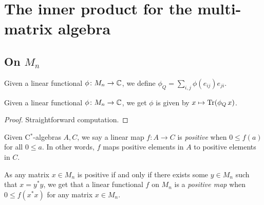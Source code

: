 \chapter{The inner product for the multi-matrix algebra}
 \section{On $M_n$}

  \begin{definition}\label{Dual.matrix}\leanok
   Given a linear functional $\phi\colon M_n \to \mathbb{C}$, we define $\phi_Q=\sum_{i,j}\phi(e_{ij})e_{ji}$.
  \end{definition}

  \begin{lemma}\label{dual_eq_trace}\leanok
   Given a linear functional $\phi\colon M_n\to\mathbb{C}$, we get $\phi$ is given by $x\mapsto\operatorname{Tr}(\phi_Q \,x)$.
  \end{lemma}
  \begin{proof}\leanok
   Straightforward computation.
  \end{proof}

  \begin{definition}\label{LinearMap.IsPosMap}\leanok
   Given C$^*$-algebras $A,C$, we say a linear map $f\colon A \to C$ is \textit{positive} when $0\leq f(a)$ for all $0\leq a$. In other words, $f$ maps positive elements in $A$ to positive elements in $C$.
  \end{definition}

  As any matrix $x\in{M_n}$ is positive if and only if there exists some $y\in M_n$ such that $x=y^*y$, we get that a linear functional $f$ on $M_n$ is a \textit{positive map} when $0\leq{f(x^*x)}$ for any matrix $x\in{M_n}$.

